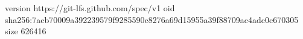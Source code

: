 version https://git-lfs.github.com/spec/v1
oid sha256:7acb70009a392239579f9285590c8276a69d15955a39f88709ac4adc0c670305
size 626416

